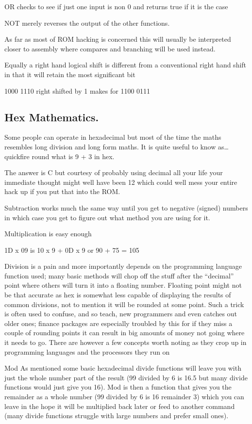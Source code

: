 \documentclass[
]{book}
\begin{document}
OR checks to see if just one input is non 0 and returns true if it is the case

NOT merely reverses the output of the other functions.

As far as most of ROM hacking is concerned this will usually be interpreted closer to assembly where compares and branching will be used instead.

Equally a right hand logical shift is different from a conventional right hand shift in that it will retain the most significant bit

1000 1110 right shifted by 1 makes for 1100 0111

\hypertarget{hex-mathematics.}{%
\subsection{Hex Mathematics.}\label{hex-mathematics.}}

Some people can operate in hexadecimal but most of the time the maths resembles long division and long form maths. It is quite useful to know as\ldots{} quickfire round what is 9 + 3 in hex.

The answer is C but courtesy of probably using decimal all your life your immediate thought might well have been 12 which could well mess your entire hack up if you put that into the ROM.

Subtraction works much the same way until you get to negative (signed) numbers in which case you get to figure out what method you are using for it.

Multiplication is easy enough

1D x 09 is 10 x 9 + 0D x 9 or 90 + 75 = 105

Division is a pain and more importantly depends on the programming language function used; many basic methods will chop off the stuff after the ``decimal'' point where others will turn it into a floating number. Floating point might not be that accurate as hex is somewhat less capable of displaying the results of common divisions, not to mention it will be rounded at some point. Such a trick is often used to confuse, and so teach, new programmers and even catches out older ones; finance packages are especially troubled by this for if they miss a couple of rounding points it can result in big amounts of money not going where it needs to go. There are however a few concepts worth noting as they crop up in programming languages and the processors they run on

Mod As mentioned some basic hexadecimal divide functions will leave you with just the whole number part of the result (99 divided by 6 is 16.5 but many divide functions would just give you 16). Mod is then a function that gives you the remainder as a whole number (99 divided by 6 is 16 remainder 3) which you can leave in the hope it will be multiplied back later or feed to another command (many divide functions struggle with large numbers and prefer small ones).
\end{document}
